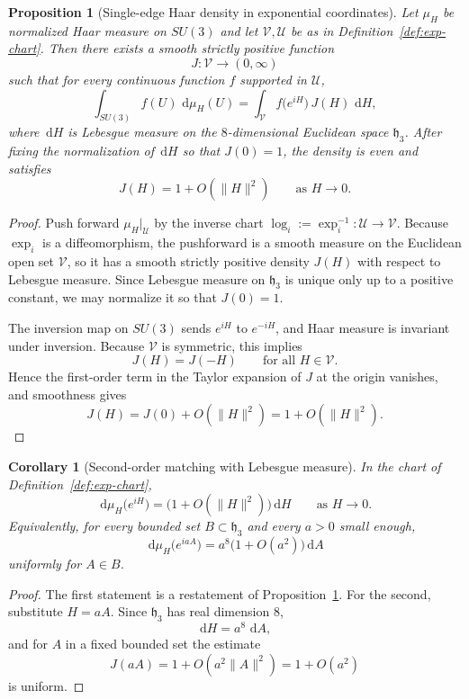 \documentclass[11pt]{article}
\newtheorem{proposition}[theorem]{Proposition}
\newtheorem{corollary}[theorem]{Corollary}
\theoremstyle{remark}
\newcommand{\dd}{\,\mathrm d}
\newcommand{\mcHh}{\mathfrak h_3}
\begin{document}
\begin{proposition}[Single-edge Haar density in exponential coordinates]
\label{prop:haar-density}
Let $\mu_H$ be normalized Haar measure on $SU(3)$ and let
$\mathcal V,\mathcal U$ be as in Definition~\ref{def:exp-chart}.  Then there
exists a smooth strictly positive function
\[
J:\mathcal V\to(0,\infty)
\]
such that for every continuous function $f$ supported in $\mathcal U$,
\[
\int_{SU(3)} f(U)\,\dd\mu_H(U)
=
\int_{\mathcal V} f\!\bigl(e^{iH}\bigr)\,J(H)\,\dd H,
\]
where $\dd H$ is Lebesgue measure on the $8$-dimensional Euclidean space
$\mcHh$.  After fixing the normalization of $\dd H$ so that $J(0)=1$, the
density is even and satisfies
\[
J(H)=1+O(\|H\|^2)
\qquad\text{as }H\to 0.
\]
\end{proposition}
\begin{proof}
Push forward $\mu_H|_{\mathcal U}$ by the inverse chart
$\log_i:=\exp_i^{-1}:\mathcal U\to\mathcal V$.
Because $\exp_i$ is a diffeomorphism, the pushforward is a smooth measure on
the Euclidean open set $\mathcal V$, so it has a smooth strictly positive
density $J(H)$ with respect to Lebesgue measure.
Since Lebesgue measure on $\mcHh$ is unique only up to a positive constant,
we may normalize it so that $J(0)=1$.

The inversion map on $SU(3)$ sends $e^{iH}$ to $e^{-iH}$, and Haar measure is
invariant under inversion.  Because $\mathcal V$ is symmetric, this implies
\[
J(H)=J(-H)
\qquad\text{for all }H\in\mathcal V.
\]
Hence the first-order term in the Taylor expansion of $J$ at the origin
vanishes, and smoothness gives
\[
J(H)=J(0)+O(\|H\|^2)=1+O(\|H\|^2).
\]
\end{proof}

\begin{corollary}[Second-order matching with Lebesgue measure]
\label{cor:haar-second-order}
In the chart of Definition~\ref{def:exp-chart},
\[
\dd\mu_H\!\bigl(e^{iH}\bigr)=\bigl(1+O(\|H\|^2)\bigr)\dd H
\qquad\text{as }H\to 0.
\]
Equivalently, for every bounded set $B\subset\mcHh$ and every $a>0$ small
enough,
\[
\dd\mu_H\!\bigl(e^{i aA}\bigr)
=
a^8\bigl(1+O(a^2)\bigr)\dd A
\]
uniformly for $A\in B$.
\end{corollary}
\begin{proof}
The first statement is a restatement of Proposition~\ref{prop:haar-density}.
For the second, substitute $H=aA$.  Since $\mcHh$ has real dimension $8$,
\[
\dd H=a^8\,\dd A,
\]
and for $A$ in a fixed bounded set the estimate
\[
J(aA)=1+O(a^2\|A\|^2)=1+O(a^2)
\]
is uniform.
\end{proof}
\end{document}
